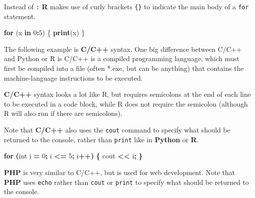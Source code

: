 \documentclass[
]{book}
\newenvironment{Shaded}{\begin{snugshade}}{\end{snugshade}}
\newcommand{\ControlFlowTok}[1]{\textcolor[rgb]{0.13,0.29,0.53}{\textbf{#1}}}
\newcommand{\DataTypeTok}[1]{\textcolor[rgb]{0.13,0.29,0.53}{#1}}
\newcommand{\DecValTok}[1]{\textcolor[rgb]{0.00,0.00,0.81}{#1}}
\newcommand{\FunctionTok}[1]{\textcolor[rgb]{0.13,0.29,0.53}{\textbf{#1}}}
\newcommand{\KeywordTok}[1]{\textcolor[rgb]{0.13,0.29,0.53}{\textbf{#1}}}
\newcommand{\NormalTok}[1]{#1}
\newcommand{\OperatorTok}[1]{\textcolor[rgb]{0.81,0.36,0.00}{\textbf{#1}}}
\newcommand{\OtherTok}[1]{\textcolor[rgb]{0.56,0.35,0.01}{#1}}
\newcommand{\SpecialCharTok}[1]{\textcolor[rgb]{0.81,0.36,0.00}{\textbf{#1}}}
\newcommand{\StringTok}[1]{\textcolor[rgb]{0.31,0.60,0.02}{#1}}
\newcommand{\VariableTok}[1]{\textcolor[rgb]{0.00,0.00,0.00}{#1}}
\begin{document}
Instead of \texttt{:} \textbf{R} makes use of curly brackets \texttt{\{\}} to indicate the main body of a \texttt{for} statement.

\begin{Shaded}
\begin{Highlighting}[]
\ControlFlowTok{for}\NormalTok{ (x }\ControlFlowTok{in} \DecValTok{0}\SpecialCharTok{:}\DecValTok{5}\NormalTok{) \{}
  \FunctionTok{print}\NormalTok{(x)}
\NormalTok{\}}
\end{Highlighting}
\end{Shaded}

The following example is \textbf{C/C++} syntax. One big difference between C/C++ and Python or R is C/C++ is a compiled programming language, which must first be compiled into a file (often *.exe, but can be anything) that contains the machine-language instructions to be executed.

\textbf{C/C++} syntax looks a lot like R, but requires semicolons at the end of each line to be executed in a code block, while R does not require the semicolon (although R will also run if there are semicolons).

Note that \textbf{C/C++} also uses the \texttt{cout} command to specify what should be returned to the console, rather than \texttt{print} like in \textbf{Python} or \textbf{R}.

\begin{Shaded}
\begin{Highlighting}[]
\ControlFlowTok{for} \OperatorTok{(}\DataTypeTok{int}\NormalTok{ i }\OperatorTok{=} \DecValTok{0}\OperatorTok{;}\NormalTok{ i }\OperatorTok{\textless{}=} \DecValTok{5}\OperatorTok{;}\NormalTok{ i}\OperatorTok{++)} \OperatorTok{\{}
\NormalTok{  cout }\OperatorTok{\textless{}\textless{}}\NormalTok{ i}\OperatorTok{;}
\OperatorTok{\}}
\end{Highlighting}
\end{Shaded}

\textbf{PHP} is very similar to C/C++, but is used for web development. Note that \textbf{PHP} uses \texttt{echo} rather than \texttt{cout} or \texttt{print} to specify what should be returned to the console.

\begin{Shaded}
\end{Shaded}
\end{document}
